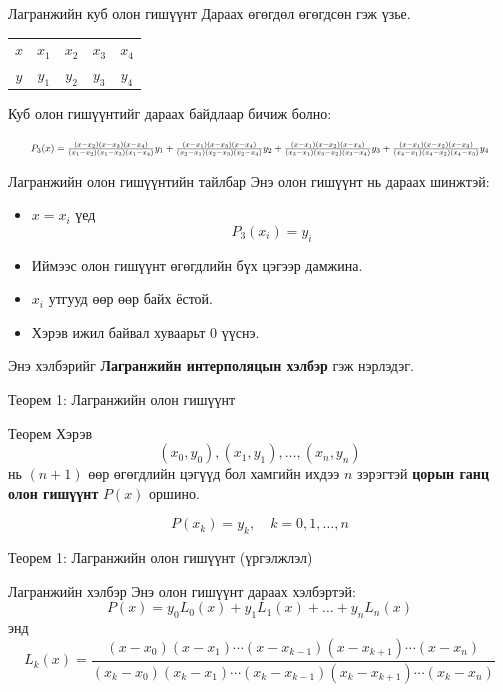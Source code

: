 \documentclass[dvipsnames]{beamer}
\begin{document}
\begin{frame}{Лагранжийн куб олон гишүүнт}
\small
Дараах өгөгдөл өгөгдсөн гэж үзье.

\begin{center}
\begin{tabular}{c c c c c}
$x$ & $x_1$ & $x_2$ & $x_3$ & $x_4$ \\
$y$ & $y_1$ & $y_2$ & $y_3$ & $y_4$
\end{tabular}
\end{center}

Куб олон гишүүнтийг дараах байдлаар бичиж болно:

\[
\resizebox{0.95\textwidth}{!}{$
P_3(x)=
\frac{(x-x_2)(x-x_3)(x-x_4)}{(x_1-x_2)(x_1-x_3)(x_1-x_4)}y_1
+
\frac{(x-x_1)(x-x_3)(x-x_4)}{(x_2-x_1)(x_2-x_3)(x_2-x_4)}y_2
+
\frac{(x-x_1)(x-x_2)(x-x_4)}{(x_3-x_1)(x_3-x_2)(x_3-x_4)}y_3
+
\frac{(x-x_1)(x-x_2)(x-x_3)}{(x_4-x_1)(x_4-x_2)(x_4-x_3)}y_4
$}
\]
\end{frame}

\begin{frame}{Лагранжийн олон гишүүнтийн тайлбар}
\small
Энэ олон гишүүнт нь дараах шинжтэй:
\begin{itemize}
\item $x = x_i$ үед
      \[
      P_3(x_i)=y_i
      \]
\item Иймээс олон гишүүнт өгөгдлийн бүх цэгээр дамжина.
\item $x_i$ утгууд өөр өөр байх ёстой.
\item Хэрэв ижил байвал хуваарьт 0 үүснэ.
\end{itemize}

Энэ хэлбэрийг \textbf{Лагранжийн интерполяцын хэлбэр} гэж нэрлэдэг.
\end{frame}

\begin{frame}{Теорем 1: Лагранжийн олон гишүүнт}
\small
\begin{block}{Теорем}
Хэрэв
\[
(x_0,y_0),(x_1,y_1),\dots,(x_n,y_n)
\]
нь $(n+1)$ өөр өгөгдлийн цэгүүд бол хамгийн ихдээ $n$ зэрэгтэй
\textbf{цорын ганц олон гишүүнт} $P(x)$ оршино.

\[
P(x_k)=y_k, \quad k=0,1,\dots,n
\]
\end{block}
\end{frame}

\begin{frame}{Теорем 1: Лагранжийн олон гишүүнт (үргэлжлэл)}
\footnotesize
\begin{block}{Лагранжийн хэлбэр}
Энэ олон гишүүнт дараах хэлбэртэй:
\[
P(x)=y_0L_0(x)+y_1L_1(x)+\dots+y_nL_n(x)
\]
энд
\[
L_k(x)=
\frac{(x-x_0)(x-x_1)\cdots(x-x_{k-1})(x-x_{k+1})\cdots(x-x_n)}
{(x_k-x_0)(x_k-x_1)\cdots(x_k-x_{k-1})(x_k-x_{k+1})\cdots(x_k-x_n)}
\]
\end{block}
\end{frame}
\end{document}
